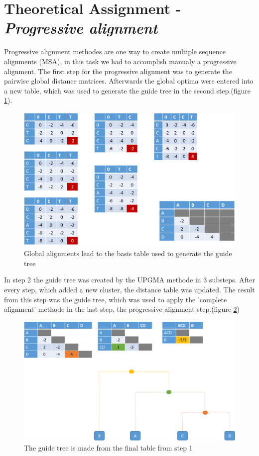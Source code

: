 \documentclass[%
   10pt,              %
   nenglish,           %
   a4paper,           %
   DIV11,             %
]{scrartcl}%
\begin{document}
\section*{Theoretical Assignment - \textsl{Progressive alignment}}
Progressive alignment methodes are one way to create multiple sequence alignments (MSA), in this task we had to accomplish manualy a progressive alignment. The first step for the progressive alignment was to generate the pairwise global distance matrices. Afterwards the global optima were entered into a new table, which was used to generate the guide tree in the second step.(figure \ref{DP2}).
\begin{figure}[h]
	\includegraphics[width=\textwidth]{Img/Exercise2-DP-Matrix.png}
	\caption{ Global alignments lead to the basis table used to generate the guide tree}
	\label{DP2}
\end{figure}

In step 2 the guide tree was created by the UPGMA methode in 3 substeps. After every step, which added a new cluster, the distance table was updated. The result from this step was the guide tree, which was used to apply the 'complete alignment' methode in the last step, the progressive alignment step.(figure \ref{guidetree2})


\begin{figure}[h]
	\includegraphics[width=\textwidth]{Img/Exercise2-Guidetree.png}
	\caption{ The guide tree is made from the final table from step 1}
	\label{guidetree2}
\end{figure}
\end{document}
